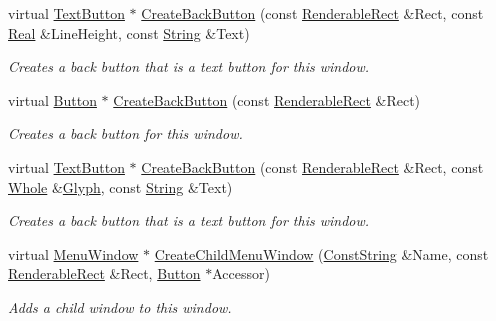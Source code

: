 \begin{DoxyCompactItemize}
virtual \hyperlink{classMezzanine_1_1UI_1_1TextButton}{TextButton} $\ast$ \hyperlink{classMezzanine_1_1UI_1_1MenuWindow_aa47aabf83f375c872a3c4bbec473fc49}{CreateBackButton} (const \hyperlink{structMezzanine_1_1UI_1_1RenderableRect}{RenderableRect} \&Rect, const \hyperlink{namespaceMezzanine_a726731b1a7df72bf3583e4a97282c6f6}{Real} \&LineHeight, const \hyperlink{namespaceMezzanine_acf9fcc130e6ebf08e3d8491aebcf1c86}{String} \&Text)
\begin{DoxyCompactList}\small\item\em Creates a back button that is a text button for this window. \item\end{DoxyCompactList}\item 
virtual \hyperlink{classMezzanine_1_1UI_1_1Button}{Button} $\ast$ \hyperlink{classMezzanine_1_1UI_1_1MenuWindow_ac03348abfea097331902ca8d34180138}{CreateBackButton} (const \hyperlink{structMezzanine_1_1UI_1_1RenderableRect}{RenderableRect} \&Rect)
\begin{DoxyCompactList}\small\item\em Creates a back button for this window. \item\end{DoxyCompactList}\item 
virtual \hyperlink{classMezzanine_1_1UI_1_1TextButton}{TextButton} $\ast$ \hyperlink{classMezzanine_1_1UI_1_1MenuWindow_acda1808f25bde401d422367cebb8fda9}{CreateBackButton} (const \hyperlink{structMezzanine_1_1UI_1_1RenderableRect}{RenderableRect} \&Rect, const \hyperlink{namespaceMezzanine_adcbb6ce6d1eb4379d109e51171e2e493}{Whole} \&\hyperlink{classMezzanine_1_1UI_1_1Glyph}{Glyph}, const \hyperlink{namespaceMezzanine_acf9fcc130e6ebf08e3d8491aebcf1c86}{String} \&Text)
\begin{DoxyCompactList}\small\item\em Creates a back button that is a text button for this window. \item\end{DoxyCompactList}\item 
virtual \hyperlink{classMezzanine_1_1UI_1_1MenuWindow}{MenuWindow} $\ast$ \hyperlink{classMezzanine_1_1UI_1_1MenuWindow_ad4159f0de7e84d177e326c37fadd4a9c}{CreateChildMenuWindow} (\hyperlink{namespaceMezzanine_a63cd699ac54b73953f35ec9cfc05e506}{ConstString} \&Name, const \hyperlink{structMezzanine_1_1UI_1_1RenderableRect}{RenderableRect} \&Rect, \hyperlink{classMezzanine_1_1UI_1_1Button}{Button} $\ast$Accessor)
\begin{DoxyCompactList}\small\item\em Adds a child window to this window. \item\end{DoxyCompactList}\item 

\end{DoxyCompactItemize}

